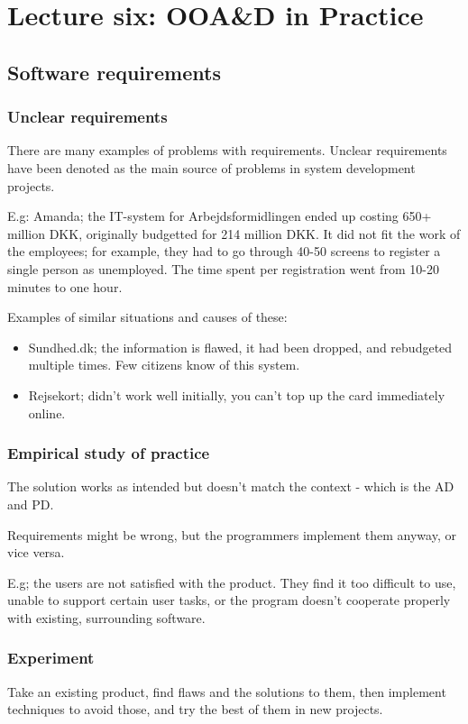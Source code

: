 \chapter{Lecture six: OOA\&D in Practice}

\section{Software requirements}
\subsection{Unclear requirements}
There are many examples of problems with requirements. Unclear requirements have been denoted as the main source of problems in system development projects.

E.g: Amanda; the IT-system for Arbejdsformidlingen ended up costing 650+ million DKK, originally budgetted for 214 million DKK. It did not fit the work of the employees; for example, they had to go through 40-50 screens to register a single person as unemployed. The time spent per registration went from 10-20 minutes to one hour.

Examples of similar situations and causes of these:

\begin{itemize}
    \item Sundhed.dk; the information is flawed, it had been dropped, and rebudgeted multiple times. Few citizens know of this system.
    \item Rejsekort; didn't work well initially, you can't top up the card immediately online.
\end{itemize}

\subsection{Empirical study of practice}
The solution works as intended but doesn't match the context - which is the AD and PD.

Requirements might be wrong, but the programmers implement them anyway, or vice versa.

E.g; the users are not satisfied with the product. They find it too difficult to use, unable to support certain user tasks, or the program doesn't cooperate properly with existing, surrounding software.

\subsection{Experiment}
Take an existing product, find flaws and the solutions to them, then implement techniques to avoid those, and try the best of them in new projects.

